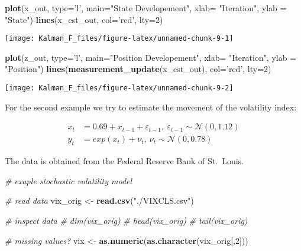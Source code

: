 \documentclass[
]{article}
\newenvironment{Shaded}{\begin{snugshade}}{\end{snugshade}}
\newcommand{\CommentTok}[1]{\textcolor[rgb]{0.56,0.35,0.01}{\textit{#1}}}
\newcommand{\DataTypeTok}[1]{\textcolor[rgb]{0.13,0.29,0.53}{#1}}
\newcommand{\DecValTok}[1]{\textcolor[rgb]{0.00,0.00,0.81}{#1}}
\newcommand{\KeywordTok}[1]{\textcolor[rgb]{0.13,0.29,0.53}{\textbf{#1}}}
\newcommand{\NormalTok}[1]{#1}
\newcommand{\StringTok}[1]{\textcolor[rgb]{0.31,0.60,0.02}{#1}}
\begin{document}
\begin{Shaded}
\begin{Highlighting}[]
\KeywordTok{plot}\NormalTok{(x_out, }\DataTypeTok{type=}\StringTok{'l'}\NormalTok{, }\DataTypeTok{main=}\StringTok{"State Developement"}\NormalTok{, }\DataTypeTok{xlab=} \StringTok{"Iteration"}\NormalTok{, }\DataTypeTok{ylab =} \StringTok{"State"}\NormalTok{)}
\KeywordTok{lines}\NormalTok{(x_est_out, }\DataTypeTok{col=}\StringTok{'red'}\NormalTok{, }\DataTypeTok{lty=}\DecValTok{2}\NormalTok{)}
\end{Highlighting}
\end{Shaded}

\begin{center}\texttt{[image: Kalman\_F\_files/figure-latex/unnamed-chunk-9-1]} \end{center}

\begin{Shaded}
\begin{Highlighting}[]
\KeywordTok{plot}\NormalTok{(z_out, }\DataTypeTok{type=}\StringTok{'l'}\NormalTok{, }\DataTypeTok{main=}\StringTok{"Position Developement"}\NormalTok{, }\DataTypeTok{xlab=} \StringTok{"Iteration"}\NormalTok{, }\DataTypeTok{ylab =} \StringTok{"Position"}\NormalTok{)}
\KeywordTok{lines}\NormalTok{(}\KeywordTok{measurement_update}\NormalTok{(x_est_out), }\DataTypeTok{col=}\StringTok{'red'}\NormalTok{, }\DataTypeTok{lty=}\DecValTok{2}\NormalTok{)}
\end{Highlighting}
\end{Shaded}

\begin{center}\texttt{[image: Kalman\_F\_files/figure-latex/unnamed-chunk-9-2]} \end{center}

For the second example we try to estimate the movement of the volatility
index:

\[
\begin{equation*}
    \begin{aligned}
        x_t  &=  0.69 + x_{t-1} + \varepsilon_{t-1},\ \varepsilon_{t-1} \sim \mathcal{N}(0,1.12)\\
        y_t  &= exp(x_t) + \nu_t, \ \nu_t \sim \mathcal{N}(0,0.78)
    \end{aligned}
\end{equation*}
\]

The data is obtained from the Federal Reserve Bank of St.~Louis.

\begin{Shaded}
\begin{Highlighting}[]
\CommentTok{# exaple stochastic volatility model}

\CommentTok{# read data}
\NormalTok{vix_orig <-}\StringTok{ }\KeywordTok{read.csv}\NormalTok{(}\StringTok{"./VIXCLS.csv"}\NormalTok{)}

\CommentTok{# inspect data}
\CommentTok{# dim(vix_orig)}
\CommentTok{# head(vix_orig)}
\CommentTok{# tail(vix_orig)}

\CommentTok{# missing values?}
\NormalTok{vix <-}\StringTok{ }\KeywordTok{as.numeric}\NormalTok{(}\KeywordTok{as.character}\NormalTok{(vix_orig[,}\DecValTok{2}\NormalTok{]))}
\end{Highlighting}
\end{Shaded}
\end{document}
